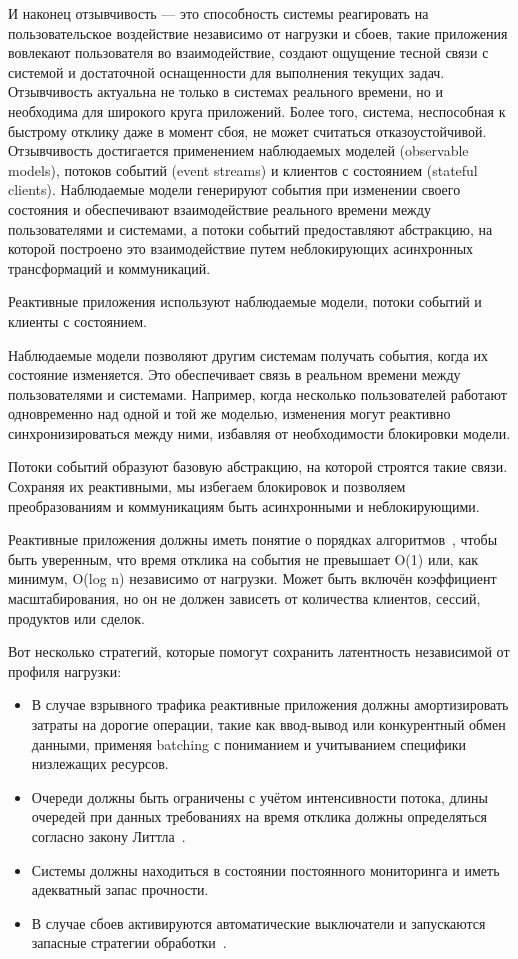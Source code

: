 И наконец отзывчивость --- это способность системы реагировать на пользовательское воздействие независимо от нагрузки и сбоев, такие приложения вовлекают пользователя во взаимодействие, создают ощущение тесной связи с системой и достаточной оснащенности для выполнения текущих задач. Отзывчивость актуальна не только в системах реального времени, но и необходима для широкого круга приложений. Более того, система, неспособная к быстрому отклику даже в момент сбоя, не может считаться отказоустойчивой. Отзывчивость достигается применением наблюдаемых моделей (observable models), потоков событий (event streams) и клиентов с состоянием (stateful clients). Наблюдаемые модели генерируют события при изменении своего состояния и обеспечивают взаимодействие реального времени между пользователями и системами, а потоки событий предоставляют абстракцию, на которой построено это взаимодействие путем неблокирующих асинхронных трансформаций и коммуникаций.

Реактивные приложения используют наблюдаемые модели, потоки событий и клиенты с состоянием.

Наблюдаемые модели позволяют другим системам получать события, когда их состояние изменяется. Это обеспечивает связь в реальном времени между пользователями и системами. Например, когда несколько пользователей работают одновременно над одной и той же моделью, изменения могут реактивно синхронизироваться между ними, избавляя от необходимости блокировки модели.

Потоки событий образуют базовую абстракцию, на которой строятся такие связи. Сохраняя их реактивными, мы избегаем блокировок и позволяем преобразованиям и коммуникациям быть асинхронными и неблокирующими.

Реактивные приложения должны иметь понятие о порядках алгоритмов~\cite{algh_complexity}, чтобы быть уверенным, что время отклика на события не превышает O(1) или, как минимум, O(log n) независимо от нагрузки. Может быть включён коэффициент масштабирования, но он не должен зависеть от количества клиентов, сессий, продуктов или сделок.

Вот несколько стратегий, которые помогут сохранить латентность независимой от профиля нагрузки:

\begin{itemize}
  \item В случае взрывного трафика реактивные приложения должны амортизировать затраты на дорогие операции, такие как ввод-вывод или конкурентный обмен данными, применяя batching с пониманием и учитыванием специфики низлежащих ресурсов.
  \item Очереди должны быть ограничены с учётом интенсивности потока, длины очередей при данных требованиях на время отклика должны определяться согласно закону Литтла~\cite{little_law}.
  \item Системы должны находиться в состоянии постоянного мониторинга и иметь адекватный запас прочности.
  \item В случае сбоев активируются автоматические выключатели и запускаются запасные стратегии обработки~\cite{circuit_breaker_design_pattern}.
\end{itemize}

